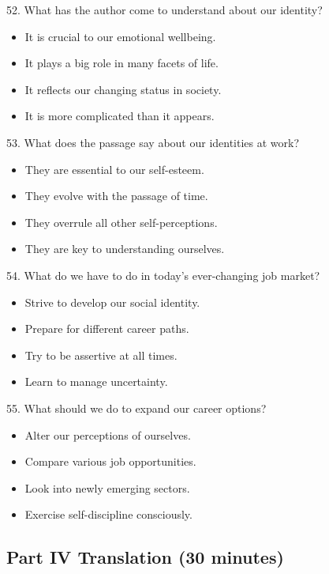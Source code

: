 \documentclass[UTF8,11pt]{ctexart}
\begin{document}
52. What has the author come to understand about our identity?


\begin{itemize}[leftmargin=2em,itemsep=.2em,topsep=.4em]\item[A.] It is crucial to our emotional wellbeing.
\item[B.] It plays a big role in many facets of life.
\item[C.] It reflects our changing status in society.
\item[D.] It is more complicated than it appears.
\end{itemize}

53. What does the passage say about our identities at work?


\begin{itemize}[leftmargin=2em,itemsep=.2em,topsep=.4em]\item[A.] They are essential to our self-esteem.
\item[B.] They evolve with the passage of time.
\item[C.] They overrule all other self-perceptions.
\item[D.] They are key to understanding ourselves.
\end{itemize}

54. What do we have to do in today’s ever-changing job market?


\begin{itemize}[leftmargin=2em,itemsep=.2em,topsep=.4em]\item[A.] Strive to develop our social identity.
\item[B.] Prepare for different career paths.
\item[C.] Try to be assertive at all times.
\item[D.] Learn to manage uncertainty.
\end{itemize}

55. What should we do to expand our career options?


\begin{itemize}[leftmargin=2em,itemsep=.2em,topsep=.4em]\item[A.] Alter our perceptions of ourselves.
\item[B.] Compare various job opportunities.
\item[C.] Look into newly emerging sectors.
\item[D.] Exercise self-discipline consciously.
\end{itemize}

\subsection*{\textbf{Part IV Translation} \textbf{(30 minutes)}}
\end{document}
